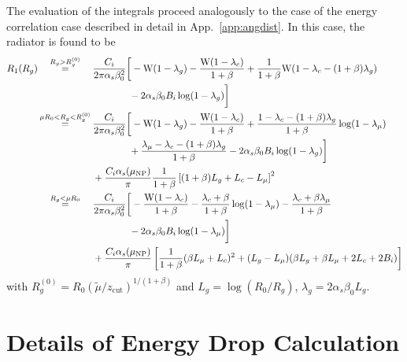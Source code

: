 \documentclass[letterpaper,11pt]{article}
\newcommand{\mut}{\tilde\mu}
\newcommand{\xlog}{{\rm W}}
\newcommand{\wideeq}[1]{\makebox[{#1}]{$=$}}
\newcommand{\zcut}{z_\text{cut}}
\DeclareRobustCommand{\App}[1]{App.~\ref{#1}}
\begin{document}
The evaluation of the integrals proceed analogously to the case of the energy correlation case described in detail in \App{app:angdist}. 
In this case, the radiator is found to be
\begin{align} \label{radiator-rad}
R_1(R_g) 
%
& \overset{R_g>R_g^{(0)}}{\wideeq{2.0cm}}  \frac{C_i}{2\pi \alpha_s \beta_0^2} \bigg[
     -\xlog(1-\lambda_g)
     -\frac{\xlog(1-\lambda_c)}{1+\beta}
     +\frac{1}{1+\beta}\xlog(1-\lambda_c-(1+\beta)\lambda_g)\notag\\
     & \phantom{\wideeq{2.0cm}\frac{C_i}{2\pi \alpha_s \beta_0^2}\;}
     -2 \alpha_s \beta_0 B_i \log(1-\lambda_g)\bigg]\\
& \overset{\mu R_0<R_g<R_g^{(0)}}{\wideeq{2.0cm}}  \frac{C_i}{2\pi \alpha_s \beta_0^2} \bigg[
     -\xlog(1-\lambda_g)
     -\frac{\xlog(1-\lambda_c)}{1+\beta}
     +\frac{1-\lambda_c-(1+\beta)\lambda_g}{1+\beta} \log(1-\lambda_\mu)\notag\\
     & \phantom{\wideeq{2.0cm}\frac{C_i}{2\pi \alpha_s \beta_0^2}\;}
     +\frac{\lambda_\mu-\lambda_c-(1+\beta)\lambda_g}{1+\beta} -2 \alpha_s \beta_0 B_i \log(1-\lambda_g) \bigg]\notag\\
     & \phantom{\wideeq{2.0cm}}+\frac{C_i \alpha_s(\mu_{\rm NP})}{\pi} \frac{1}{1+\beta} \left[(1+\beta)L_g+L_c-L_\mu\right]^2\\
& \overset{R_g<\mu R_0}{\wideeq{2.0cm}} \frac{C_i}{2\pi \alpha_s \beta_0^2} \bigg[
     -\frac{\xlog(1-\lambda_c)}{1+\beta}
     -\frac{\lambda_c+\beta}{1+\beta} \log(1-\lambda_\mu)
     -\frac{\lambda_c+\beta \lambda_\mu}{1+\beta}\notag\\
     & \phantom{\wideeq{2.0cm}\frac{C_i}{2\pi \alpha_s \beta_0^2}\;}
     -2\alpha_s \beta_0 B_i\log(1-\lambda_\mu)\bigg]\notag\\
     & \phantom{\wideeq{2.0cm}}+ \frac{C_i\alpha_s(\mu_{\rm NP})}{\pi} \left[\frac{1}{1+\beta} (\beta L_\mu+L_c)^2+(L_g-L_\mu) (\beta L_g+\beta L_\mu+2 L_c+2 B_i)\right]
\end{align}
with $R_g^{(0)}=R_0 (\mut/\zcut)^{1/(1+\beta)}$ and $L_g=\log(R_0/R_g)$,
$\lambda_g=2\alpha_s \beta_0 L_g$.


\section{Details of Energy Drop Calculation}\label{app:edist}
\end{document}
